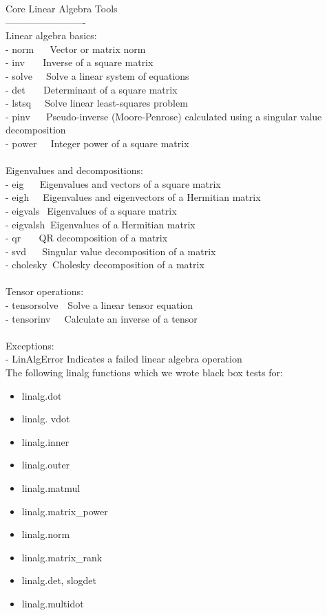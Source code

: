 \documentclass[a4paper,11pt]{article}
\begin{document}
Core Linear Algebra Tools\\
-------------------------\\
Linear algebra basics:\\
- norm$~~~~~~$             Vector or matrix norm\\
- inv$~~~~~~~$             Inverse of a square matrix\\
- solve$~~~~~$             Solve a linear system of equations\\
- det$~~~~~~~$             Determinant of a square matrix\\
- lstsq$~~~~~$             Solve linear least-squares problem\\
- pinv$~~~~~~$             Pseudo-inverse (Moore-Penrose) calculated using a singular value decomposition\\
- power$~~~~~$    Integer power of a square matrix\\
\\
Eigenvalues and decompositions:\\
- eig$~~~~~~$             Eigenvalues and vectors of a square matrix\\
- eigh$~~~~~$            Eigenvalues and eigenvectors of a Hermitian matrix\\
- eigvals$~~$         Eigenvalues of a square matrix\\
- eigvalsh$~$        Eigenvalues of a Hermitian matrix\\
- qr$~~~~~~~$              QR decomposition of a matrix\\
- svd$~~~~~~$             Singular value decomposition of a matrix\\
- cholesky$~$        Cholesky decomposition of a matrix\\
\\
Tensor operations:\\
- tensorsolve$~~~$     Solve a linear tensor equation\\
- tensorinv$~~~~~$       Calculate an inverse of a tensor\\
\\
Exceptions:\\
- LinAlgError     Indicates a failed linear algebra operation\\

\newpage
The following linalg functions which we wrote black box tests for: \\
\begin{itemize}
	\item linalg.dot 
	\item linalg. vdot
	\item linalg.inner 
	\item linalg.outer 
	\item linalg.matmul 
	\item linalg.matrix\_power
	\item linalg.norm
	\item linalg.matrix\_rank
	\item linalg.det, slogdet 
	\item linalg.multidot 
\end{itemize}
\end{document}
